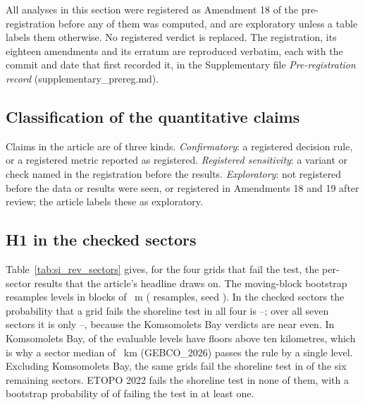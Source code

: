 
All analyses in this section were registered as Amendment 18 of the pre-registration before any of them was computed, and are exploratory unless a table labels them otherwise. No registered verdict is replaced. The registration, its eighteen amendments and its erratum are reproduced verbatim, each with the commit and date that first recorded it, in the Supplementary file \emph{Pre-registration record} (supplementary\_prereg.md).

\subsection*{Classification of the quantitative claims}
Claims in the article are of three kinds. \emph{Confirmatory}: a registered decision rule, or a registered metric reported as registered. \emph{Registered sensitivity}: a variant or check named in the registration before the results. \emph{Exploratory}: not registered before the data or results were seen, or registered in Amendments 18 and 19 after review; the article labels these as exploratory.

\subsection*{H1 in the checked sectors}
Table~\ref{tab:si_rev_sectors} gives, for the four grids that fail the test, the per-sector results that the article's headline draws on. The moving-block bootstrap resamples levels in blocks of ~m ( resamples, seed ). In the checked sectors the probability that a grid fails the shoreline test in all four is --; over all seven sectors it is only --, because the Komsomolets Bay verdicts are near even. In Komsomolets Bay,  of the evaluable levels have floors above ten kilometres, which is why a sector median of ~km (GEBCO\_2026) passes the rule by a single level. Excluding Komsomolets Bay, the same grids fail the shoreline test in  of the six remaining sectors. ETOPO 2022 fails the shoreline test in none of them, with a bootstrap probability of  of failing the test in at least one.

